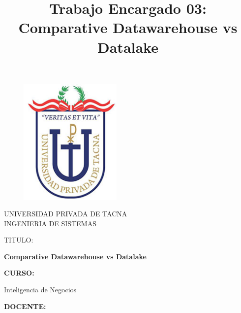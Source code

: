 \documentclass[twoside,twocolumn]{article}
\begin{document}
\title{Trabajo Encargado 03: Comparative Datawarehouse vs Datalake}

\begin{titlepage}
\begin{figure}[htb]
\begin{center}
\includegraphics[width=5cm]{imagenes/logo.png}
\end{center}
\end{figure}
\vspace*{-0.25in}
\begin{center}
\large{UNIVERSIDAD PRIVADA DE TACNA}\\
\vspace*{-0.025in}
INGENIERIA DE SISTEMAS  \\	

\vspace*{0.5in}
\begin{large}
TITULO:\\
\end{large}

\vspace*{0.1in}
\begin{Large}
\textbf{ Comparative Datawarehouse vs Datalake} \\
\end{Large}

\vspace*{0.3in}
\begin{Large}
\textbf{CURSO:} \\
\end{Large}

\vspace*{0.1in}
\begin{large}
Inteligencia de Negocios\\
\end{large}

\vspace*{0.3in}
\begin{Large}
\textbf{DOCENTE:} \\
\end{Large}


\end{center}
\end{titlepage}
\end{document}
